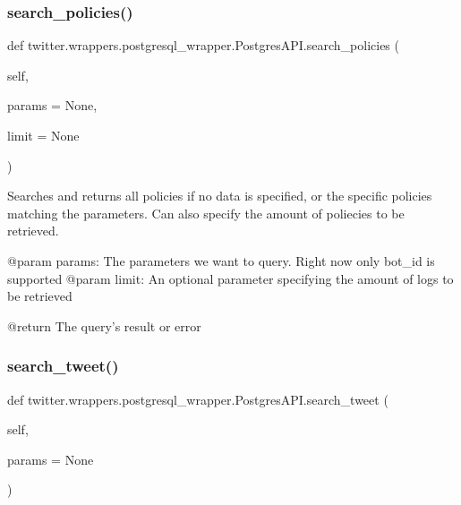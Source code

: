 \subsubsection{\texorpdfstring{search\+\_\+policies()}{search\_policies()}}
{\footnotesize\ttfamily def twitter.\+wrappers.\+postgresql\+\_\+wrapper.\+Postgres\+A\+P\+I.\+search\+\_\+policies (\begin{DoxyParamCaption}\item[{}]{self,  }\item[{}]{params = {\ttfamily None},  }\item[{}]{limit = {\ttfamily None} }\end{DoxyParamCaption})}

\begin{DoxyVerb}Searches and returns all policies if no data is specified, or the specific policies matching the parameters.
Can also specify the amount of poliecies to be retrieved.

@param params: The parameters we want to query. Right now only bot_id is supported
@param limit: An optional parameter specifying the amount of logs to be retrieved

@return The query's result or error
\end{DoxyVerb}
 \mbox{\label{classtwitter_1_1wrappers_1_1postgresql__wrapper_1_1PostgresAPI_a772c1a47184e165cfe9958c78a97a146}} 
\subsubsection{\texorpdfstring{search\+\_\+tweet()}{search\_tweet()}}
{\footnotesize\ttfamily def twitter.\+wrappers.\+postgresql\+\_\+wrapper.\+Postgres\+A\+P\+I.\+search\+\_\+tweet (\begin{DoxyParamCaption}\item[{}]{self,  }\item[{}]{params = {\ttfamily None} }\end{DoxyParamCaption})}

